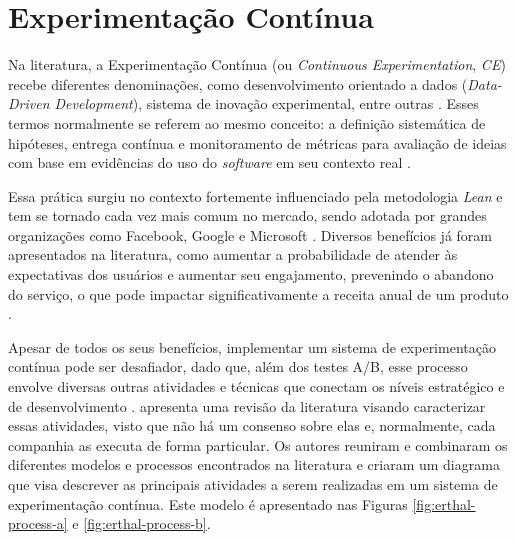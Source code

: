 \section{Experimentação Contínua}
\label{sec:ref-experimentacao-continua}

Na literatura, a Experimentação Contínua (ou \textit{Continuous Experimentation}, \textit{CE}) recebe diferentes denominações, como desenvolvimento orientado a dados (\textit{Data-Driven Development}), sistema de inovação experimental, entre outras \cite{erthal_characterization_2023}. Esses termos normalmente se referem ao mesmo conceito: a definição sistemática de hipóteses, entrega contínua e monitoramento de métricas para avaliação de ideias com base em evidências do uso do \textit{software} em seu contexto real \cite{fagerholm_right_2017}.

Essa prática surgiu no contexto fortemente influenciado pela metodologia \textit{Lean} e tem se tornado cada vez mais comum no mercado, sendo adotada por grandes organizações como Facebook, Google e Microsoft \cite{issa_mattos_hurrier_2023}. Diversos benefícios já foram apresentados na literatura, como aumentar a probabilidade de atender às expectativas dos usuários e aumentar seu engajamento, prevenindo o abandono do serviço, o que pode impactar significativamente a receita anual de um produto \cite{erthal_characterization_2023}.

Apesar de todos os seus benefícios, implementar um sistema de experimentação contínua pode ser desafiador, dado que, além dos testes A/B, esse processo envolve diversas outras atividades e técnicas que conectam os níveis estratégico e de desenvolvimento \cite{issa_mattos_hurrier_2023}.  apresenta uma revisão da literatura visando caracterizar essas atividades, visto que não há um consenso sobre elas e, normalmente, cada companhia as executa de forma particular. Os autores reuniram e combinaram os diferentes modelos e processos encontrados na literatura e criaram um diagrama que visa descrever as principais atividades a serem realizadas em um sistema de experimentação contínua. Este modelo é apresentado nas Figuras \ref{fig:erthal-process-a} e \ref{fig:erthal-process-b}.


